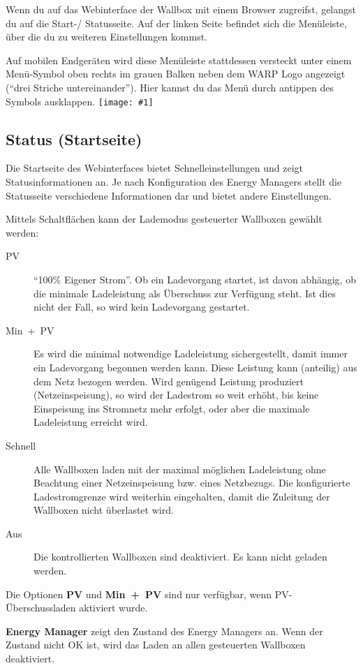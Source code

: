 \documentclass[a4paper,10pt]{article}
\newcommand{\gfx}[1]{\texttt{[image: \#1]}}
\begin{document}
\begin{multicols*}{2}
	Wenn du auf das Webinterface der Wallbox mit einem Browser zugreifst,
	gelangst du auf die Start-/ Statusseite. Auf der linken Seite befindet sich
	die Menüleiste, über die du zu weiteren Einstellungen kommst.

	Auf mobilen Endgeräten wird
	diese Menüleiste stattdessen versteckt unter einem Menü-Symbol oben rechts
	im grauen Balken neben dem WARP Logo angezeigt (\enquote{drei Striche untereinander}).
	Hier kannst du das Menü durch antippen des Symbols ausklappen.
	\gfx{./img_v2/wem2-web-status}

	\vspace{-0.4cm}
	\subsection{Status (Startseite)}
	\label{status}
	Die Startseite des Webinterfaces bietet Schnelleinstellungen und zeigt Statusinformationen an.
    Je nach Konfiguration des Energy Managers stellt die Statusseite verschiedene Informationen dar und bietet andere Einstellungen.

	Mittels Schaltflächen kann der Lademodus gesteuerter
	Wallboxen gewählt werden:
	\begin{description}
	\item[PV] \enquote{100\% Eigener Strom}. Ob ein
	Ladevorgang startet, ist davon abhängig, ob die minimale Ladeleistung
	als Überschuss zur Verfügung steht. Ist dies nicht der Fall, so
	wird kein Ladevorgang gestartet.
	\item[Min~+~PV] Es wird die minimal notwendige Ladeleistung sichergestellt, damit immer ein Ladevorgang begonnen werden kann. Diese Leistung kann (anteilig) aus dem Netz bezogen werden. Wird genügend Leistung produziert (Netzeinspeisung), so wird
	der Ladestrom so weit erhöht, bis keine Einspeisung ins Stromnetz mehr
	erfolgt, oder aber die maximale Ladeleistung erreicht wird.
	\item[Schnell] Alle Wallboxen laden mit der maximal möglichen
	Ladeleistung ohne Beachtung einer Netzeinspeisung bzw. eines Netzbezugs. Die konfigurierte Ladestromgrenze wird weiterhin eingehalten, damit die Zuleitung der Wallboxen nicht überlastet wird.
	\item[Aus] Die kontrollierten Wallboxen sind deaktiviert. Es kann
	nicht geladen werden.
	\end{description}
	Die Optionen \textbf{PV} und \textbf{Min~+~PV} sind nur verfügbar, wenn PV-Überschussladen aktiviert wurde.

	\textbf{Energy Manager} zeigt den Zustand des Energy Managers an. Wenn der Zustand nicht OK ist, wird das Laden an allen gesteuerten Wallboxen deaktiviert.


\end{multicols*}
\end{document}
